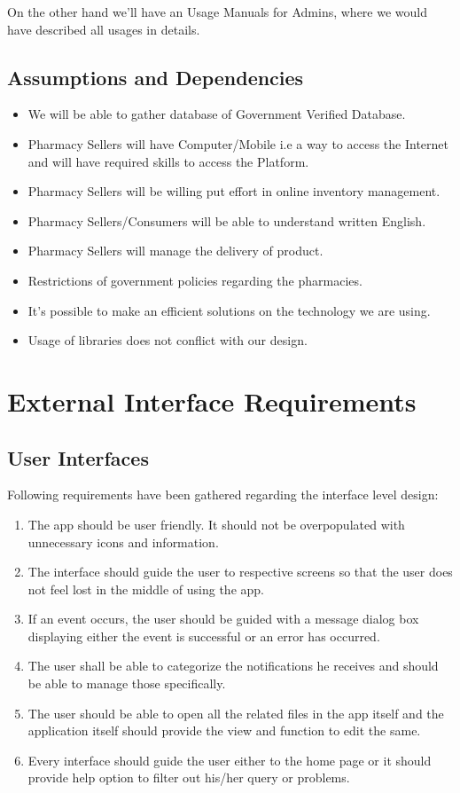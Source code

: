 \documentclass{scrreprt}
\begin{document}
 On the other hand we’ll have an Usage Manuals for Admins, where we would have described all usages in details.   \\

\section{Assumptions and Dependencies}
\begin{itemize}
\item We will be able to gather database of Government Verified Database.
\item Pharmacy Sellers will have Computer/Mobile i.e a way to access the Internet
      and will have required skills to access the Platform.
\item Pharmacy Sellers will be willing put effort in online inventory management.
\item Pharmacy Sellers/Consumers will be able to understand written English.
\item Pharmacy Sellers will manage the delivery of product.
\item Restrictions of government policies regarding the pharmacies.
\item It’s possible to make an efficient solutions on the technology we are using.
\item Usage of libraries does not conflict with our design.
\end{itemize}

\chapter{External Interface Requirements}

\section{User Interfaces}
Following requirements have been gathered regarding the interface level design:
\begin{enumerate}
\item The app should be user friendly. It should not be overpopulated with unnecessary icons and information. 
\item The interface should guide the user to respective screens so that the user does not feel lost in the middle of using the app.
\item If an event occurs, the user should be guided with a message dialog box displaying either the event is successful or an error has 
       occurred.    
\item The user shall be able to categorize the notifications he receives and should be able to manage those specifically.
\item The user should be able to open all the related files in the app itself and the application itself should provide the view and           function to edit the same.
\item Every interface should guide the user either to the home page or it should provide help option to filter out his/her query or problems. 
\end{enumerate}
\end{document}
